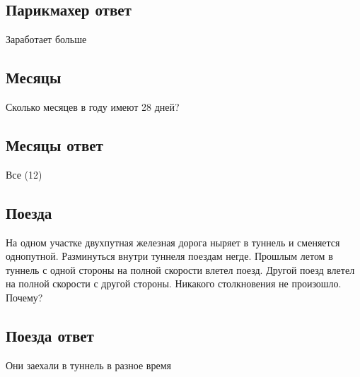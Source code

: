 \documentclass[compress,red]{beamer}
\begin{document}
\subsection{Парикмахер ответ}
\begin{frame}
  \begin{center}
    \Huge{Заработает больше}
  \end{center}
\end{frame}

\subsection{Месяцы}
\begin{frame}
  \begin{center}
    \Huge{Сколько месяцев в году имеют 28 дней?}
  \end{center}
\end{frame}

\subsection{Месяцы ответ}
\begin{frame}
  \begin{center}
    \Huge{Все (12)}
  \end{center}
\end{frame}

\subsection{Поезда}
\begin{frame}
  \begin{center}
    \Large{На одном участке двухпутная железная дорога ныряет в туннель и сменяется однопутной. Разминуться внутри туннеля поездам негде. Прошлым летом в туннель с одной стороны на полной скорости влетел поезд. Другой поезд влетел на полной скорости с другой стороны. Никакого столкновения не произошло. Почему?}
  \end{center}
\end{frame}

\subsection{Поезда ответ}
\begin{frame}
  \begin{center}
    \Huge{Они заехали в туннель в разное время}
  \end{center}
\end{frame}
\end{document}
